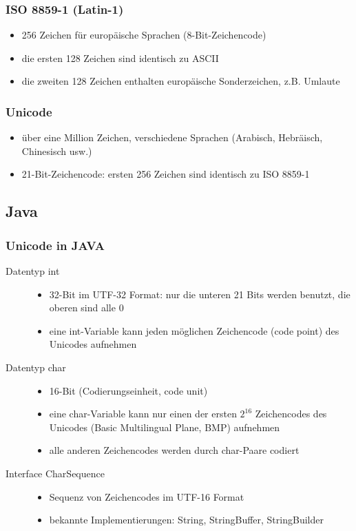 \documentclass[a4paper,10pt]{article}
\begin{document}
\subsubsection{ISO 8859-1 (Latin-1)}
\begin{itemize}
	\item 256 Zeichen für europäische Sprachen (8-Bit-Zeichencode)
	\item die ersten 128 Zeichen sind identisch zu ASCII
	\item die zweiten 128 Zeichen enthalten europäische Sonderzeichen, z.B. Umlaute
\end{itemize}
\subsubsection{Unicode}
\begin{itemize}
	\item \"uber eine Million Zeichen, verschiedene Sprachen (Arabisch, Hebräisch, Chinesisch usw.)
	\item 21-Bit-Zeichencode: ersten 256 Zeichen sind identisch zu ISO 8859-1
\end{itemize}

\subsection{Java}
\subsubsection{Unicode in JAVA}
\begin{description}
	\item[Datentyp int] \hfill 
		\begin{itemize}
			\item 32-Bit im UTF-32 Format: nur die unteren 21 Bits werden benutzt, die oberen sind alle 0
			\item eine int-Variable kann jeden möglichen Zeichencode (code point) des Unicodes aufnehmen
		\end{itemize}
	\item[Datentyp char] \hfill 
		\begin{itemize}
			\item 16-Bit (Codierungseinheit, code unit)
			\item eine char-Variable kann nur einen der ersten $2^16$ Zeichencodes des Unicodes (Basic Multilingual Plane, BMP) aufnehmen
			\item alle anderen Zeichencodes werden durch char-Paare codiert
		\end{itemize}
	\item[Interface CharSequence] \hfill 
		\begin{itemize}
			\item Sequenz von Zeichencodes im UTF-16 Format
			\item bekannte Implementierungen: String, StringBuffer, StringBuilder
		\end{itemize}
\end{description}
\end{document}
